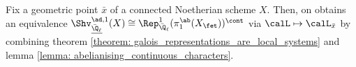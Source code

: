         \begin{corollary} \label{coro: abelian_galois_characters_are_local_systems}
            Fix a geometric point $\bar{x}$ of a connected Noetherian scheme $X$. Then, on obtains an equivalence $\Shv_{\underline{\bar{\Q}_{\ell}}}^{\ad, 1}(X) \cong \Rep^1_{\bar{\Q}_{\ell}}(\pi_1^{\ab}(X_{\fet}))^{\cont}$ via $\calL \mapsto \calL_{\bar{x}}$ by combining theorem \ref{theorem: galois_representations_are_local_systems} and lemma \ref{lemma: abelianising_continuous_characters}.
        \end{corollary}